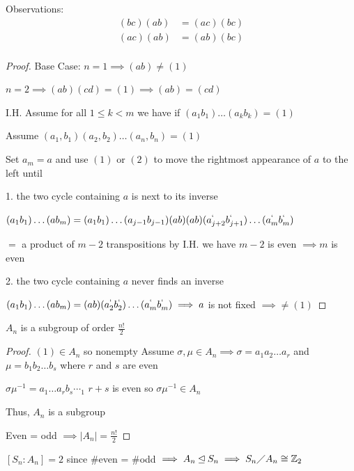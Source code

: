 Observations:
\begin{align}
    (bc)(ab)&=(ac)(bc)\\
    (ac)(ab)&=(ab)(bc)\\
\end{align}
\begin{proof}
    Base Case: $n=1 \implies (ab)\neq (1)$
    
    $n=2 \implies (ab)(cd)=(1) \implies (ab)=(cd)$

    I.H. Assume for all $1 \leq k < m$ we have if $(a_1b_1)\dots(a_kb_k)=(1)$

    Assume $(a_1,b_1)(a_2,b_2)\dots(a_n,b_n)=(1)$

    Set $a_m=a$ and use $(1)$ or $(2)$ to move the rightmost appearance of $a$ to the left until

    1. the two cycle containing $a$ is next to its inverse
    
    $(a_1b_1)\dots(ab_m)=(a_1b_1)\dots(a_{j-1}b_{j-1})(ab)(ab)(a_{j+2}^`b_{j+1}^`)\dots(a_m^`b_m^`)$
    
    $=$ a product of $m-2$ transpositions by I.H. we have $m-2$ is even $\implies m$ is even

    2. the two cycle containing $a$ never finds an inverse

    $(a_1b_1)\dots(ab_m)=(ab)(a_2^`b_2^`)\dots(a_m^`b_m^`) \implies a$ is not fixed $\implies \neq (1)$
\end{proof}
\newpage
\begin{proposition}
    $A_n$ is a subgroup of order $\frac{n!}{2}$
\end{proposition}

\begin{proof}
    $(1)\in A_n$ so nonempty
    Assume $\sigma,\mu \in A_n \implies \sigma=a_1a_2\dots a_r$ and $\mu=b_1b_2\dots b_s$
    where $r$ and $s$ are even

    $\sigma\mu^{-1}=a_1\dots a_rb_s\dotsb_1$ $r+s$ is even so $\sigma\mu^{-1}\in A_n$

    Thus, $A_n$ is a subgroup

    Even = odd $\implies |A_n|=\frac{n!}{2}$
\end{proof}

\begin{corollary}
    $[S_n:A_n]=2$ since \#even = \#odd 
    $\implies A_n \unlhd S_n \implies S_n\diagup A_n \cong \mathbb{Z}_2$
\end{corollary}


